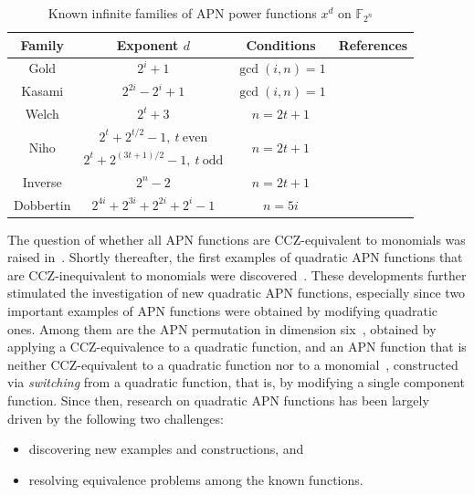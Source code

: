 \documentclass{amsart}[11pt]
\theoremstyle{plain}
\theoremstyle{definition}
\numberwithin{theorem}{section}
\numberwithin{equation}{section}
\numberwithin{table}{section}
\numberwithin{figure}{section}
\numberwithin{algorithm}{section}
\begin{document}
\begin{table}%
	\centering
	\caption{Known infinite families of APN power functions $x^d$ on $\mathbb{F}_{2^n}$}
	\begin{tabular}{c|cc|c}
		\hline
		Family & Exponent $d$ & Conditions & References \\
		\hline 
		Gold & $2^i + 1$ & $\gcd(i,n)=1$ & \cite{Gold1968,Nyberg93} \\
		\hline
		Kasami & $2^{2i} - 2^i + 1$ & $\gcd(i,n)=1$ & \cite{JanwaWilson1993, Kasami1971} \\
		\hline
		Welch & $2^t + 3$ & $n = 2t + 1$ & \cite{Dobbertin1999:Welch} \\
		\hline
		\multirow{2}{*}{Niho} 
		& $2^t + 2^{t/2} - 1,\ t\ \text{even}$ & \multirow{2}{*}{$n = 2t + 1$} & \multirow{2}{*}{\cite{Dobbertin1999:Niho}} \\
		\cline{2-2}
		& $2^t + 2^{(3t+1)/2} - 1,\ t\ \text{odd}$ &  &  \\
		\hline
		Inverse & $2^{n} - 2$ & $n = 2t + 1$ & \cite{BethDing1994,Nyberg93} \\
		\hline
		Dobbertin & $2^{4i} + 2^{3i} + 2^{2i} + 2^i - 1$ & $n = 5i$ & \cite{Dobbertin2001:DivBy5} \\
		\hline
	\end{tabular}
	\label{table:apn_monomials}
\end{table}
	
The question of whether all APN functions are CCZ-equivalent to monomials was raised in~\cite{DobbertinMMPW2003}. Shortly thereafter, the first examples of quadratic APN functions that are CCZ-inequivalent to monomials were discovered~\cite{EdelKP2006}. These developments further stimulated the investigation of new quadratic APN functions, especially since two important examples of APN functions were obtained by modifying quadratic ones. Among them are the APN permutation in dimension six~\cite{Dillon-perm}, obtained by applying a CCZ-equivalence to a quadratic function, and an APN function that is neither CCZ-equivalent to a quadratic function nor to a monomial~\cite{EdelP09}, constructed via \emph{switching} from a quadratic function, that is, by modifying a single component function. Since then, research on quadratic APN functions has been largely driven by the following two challenges:
\begin{itemize}
	\item[(I)] discovering new examples and constructions, and 
	\item[(II)] resolving equivalence problems among the known functions.
\end{itemize}
\end{document}
